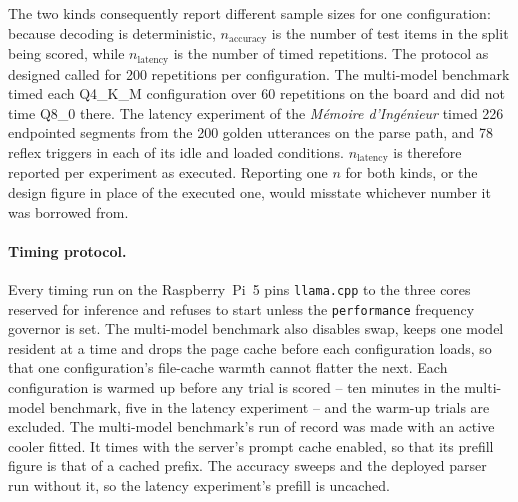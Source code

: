 The two kinds consequently report different sample sizes for one configuration: because decoding is
deterministic, $n_{\mathrm{accuracy}}$ is the number of test items in the split being scored, while
$n_{\mathrm{latency}}$ is the number of timed repetitions. The protocol as designed called for 200
repetitions per configuration. The multi-model benchmark timed each Q4\_K\_M configuration over 60
repetitions on the board and did not time Q8\_0 there. The latency experiment of the
\emph{M\'emoire d'Ing\'enieur} timed 226 endpointed segments from the 200 golden utterances on the
parse path, and 78 reflex triggers in each of its idle and loaded conditions.
$n_{\mathrm{latency}}$ is therefore reported per experiment as executed. Reporting one $n$ for both kinds, or the design figure in place of the
executed one, would misstate whichever number it was borrowed from.

\paragraph{Timing protocol.} Every timing run on the Raspberry~Pi~5 pins \texttt{llama.cpp} to the
three cores reserved for inference and refuses to start unless the \texttt{performance} frequency
governor is set. The multi-model benchmark also disables swap, keeps one model resident at a time
and drops the page cache before each configuration loads, so that one configuration's file-cache
warmth cannot flatter the next. Each configuration is warmed up before any trial is scored -- ten
minutes in the multi-model benchmark, five in the latency experiment -- and the warm-up trials are
excluded. The multi-model benchmark's run of record was made with an active cooler fitted. It times
with the server's prompt cache enabled, so that its prefill figure is that of a cached prefix. The
accuracy sweeps and the deployed parser run without it, so the latency experiment's prefill is
uncached.

